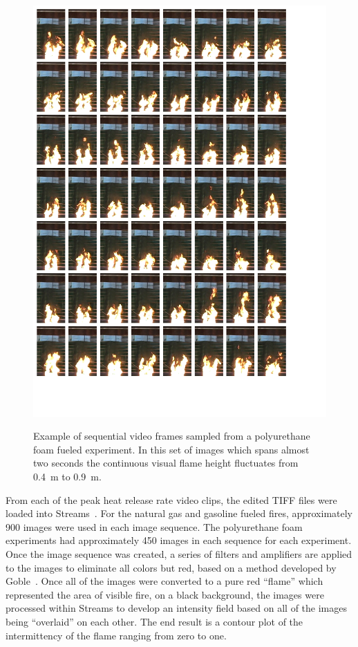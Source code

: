 \documentclass[twoside]{uocthesis}
\begin{document}
{\begin{figure}
	\centering
	\includegraphics[width=\textwidth]{../Figures/flame_height_comp_FHPUF}\\
	\caption[Example of sequential video frames sampled from a polyurethane foam fueled experiment]{Example of sequential video frames sampled from a polyurethane foam fueled experiment.  In this set of images which spans almost two seconds the continuous visual flame height fluctuates from 0.4~m to 0.9~m.}
	\label{flame_height_comp_FHPUF_1}
\end{figure}


From each of the peak heat release rate video clips, the edited TIFF files were loaded into Streams~\cite{Nokes:2011}.  For the natural gas and gasoline fueled fires, approximately 900 images were used in each image sequence.  The polyurethane foam experiments had approximately 450 images in each sequence for each experiment.  Once the image sequence was created, a series of filters and amplifiers are applied to the images to eliminate all colors but red, based on a method developed by Goble~\cite{Goble:2007}.  Once all of the images were converted to a pure red ``flame'' which represented the area of visible fire, on a black background, the images were processed within Streams to develop an intensity field based on all of the images being ``overlaid'' on each other.  The end result is a contour plot of the intermittency of the flame ranging from zero to one.

}
\end{document}
